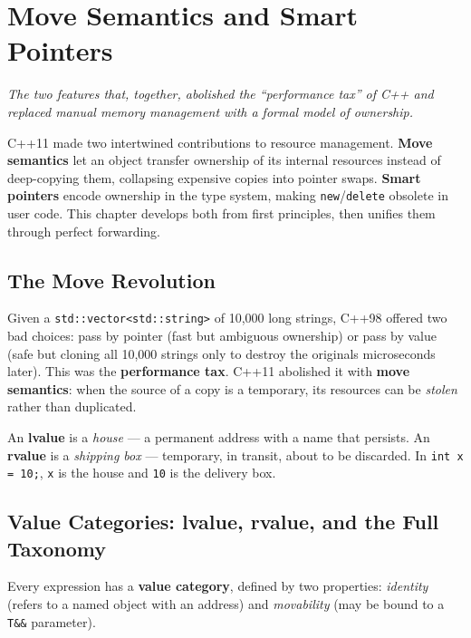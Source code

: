 \chapter{Move Semantics and Smart Pointers}
\label{ch:move-smart-pointers}

\textit{The two features that, together, abolished the ``performance tax'' of C++ and replaced manual memory management with a formal model of ownership.}

C++11 made two intertwined contributions to resource management. \textbf{Move semantics} let an object transfer ownership of its internal resources instead of deep-copying them, collapsing expensive copies into pointer swaps. \textbf{Smart pointers} encode ownership in the type system, making \texttt{new}/\texttt{delete} obsolete in user code. This chapter develops both from first principles, then unifies them through perfect forwarding.

\section{The Move Revolution}

Given a \texttt{std::vector<std::string>} of 10,000 long strings, C++98 offered two bad choices: pass by pointer (fast but ambiguous ownership) or pass by value (safe but cloning all 10,000 strings only to destroy the originals microseconds later). This was the \textbf{performance tax}. C++11 abolished it with \textbf{move semantics}: when the source of a copy is a temporary, its resources can be \emph{stolen} rather than duplicated.

An \textbf{lvalue} is a \emph{house} --- a permanent address with a name that persists. An \textbf{rvalue} is a \emph{shipping box} --- temporary, in transit, about to be discarded. In \texttt{int x = 10;}, \texttt{x} is the house and \texttt{10} is the delivery box.

\section{Value Categories: lvalue, rvalue, and the Full Taxonomy}

Every expression has a \textbf{value category}, defined by two properties: \emph{identity} (refers to a named object with an address) and \emph{movability} (may be bound to a \texttt{T\&\&} parameter).

